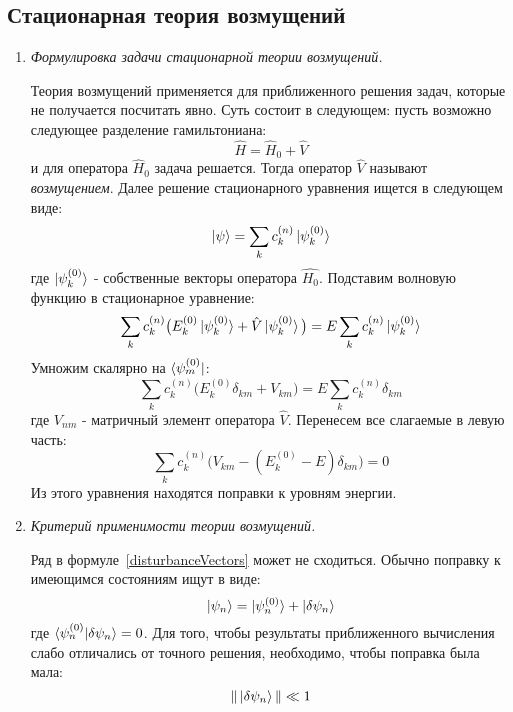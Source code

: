 \documentclass{article}
\begin{document}
\subsection*{Стационарная теория возмущений}
	\begin{enumerate}
		\item \textit{Формулировка задачи стационарной теории возмущений.}
		
		Теория возмущений применяется для приближенного решения задач, которые не получается посчитать явно. Суть состоит в следующем: пусть возможно следующее разделение гамильтониана:
		\begin{equation}
			\hat{H} = \hat{H}_0 + \hat{V}
		\end{equation}
		и для оператора $\hat{H}_0$ задача решается. Тогда оператор $\hat{V}$ называют \textit{возмущением}. Далее решение стационарного уравнения ищется в следующем виде:
		\begin{equation}
			\ket{\psi} = \sum\limits_{k} c_k^{(n)} \ket{\psi_k^{(0)}} \label{disturbanceVectors}
		\end{equation}
		где $\ket{\psi_k^{(0)}}$ - собственные векторы оператора $\hat{H_0}$. Подставим волновую функцию в стационарное уравнение:
		\begin{equation}
			\sum\limits_{k}c_k^{(n)}\big(E_k^{(0)} \ket{\psi_k^{(0)}} + \hat{V}\ket{\psi_k^{(0)}}\big) = E\sum\limits_{k}c_k^{(n)} \ket{\psi_k^{(0)}}
		\end{equation}
		Умножим скалярно на $\bra{\psi_m^{(0)}}$:
		\begin{equation}
			\sum\limits_{k}c_k^{(n)}\big(E_k^{(0)} \delta_{km} + V_{km}\big) = E\sum\limits_{k}c_k^{(n)}\delta_{km}
		\end{equation}
		где $V_{nm}$ - матричный элемент оператора $\hat{V}$. Перенесем все слагаемые в левую часть:
		\begin{equation}
			\sum\limits_{k}c_k^{(n)}\big(V_{km} - (E_k^{(0)} - E) \delta_{km}\big) = 0
		\end{equation}
		Из этого уравнения находятся поправки к уровням энергии.
		
		\item \textit{Критерий применимости теории возмущений.}
		
		Ряд в формуле~\eqref{disturbanceVectors} может не сходиться. Обычно поправку к имеющимся состояниям ищут в виде:
		\begin{equation}
			\ket{\psi_n} = \ket{\psi_n^{(0)}} + \ket{\delta \psi_n}
		\end{equation}
		где $\braket{\psi_n^{(0)}|\delta \psi_n} = 0$. Для того, чтобы результаты приближенного вычисления слабо отличались от точного решения, необходимо, чтобы поправка была мала:
		\begin{equation}
			\|\ket{\delta \psi_n}\| \ll 1
		\end{equation}
		

\end{enumerate}
\end{document}
